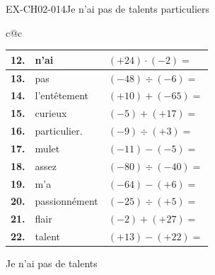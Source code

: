 \documentclass[12pt, a4paper]{article}
\begin{document}
\begin{exercice}{EX-CH02-014}{Je n'ai pas de talents particuliers}
\begin{center}
\begin{tabular}{c@{\hspace{8mm}}c}
  \begin{tabular}{|>{\centering\arraybackslash}p{6mm}|p{3.5cm}|p{3cm}|}
    \hline
    \cellcolor{gray!40}\textbf{12.} &n'ai& $(+24)\cdot(-2)=$             \\ \hline
    \cellcolor{gray!40}\textbf{13.} &pas& $(-48)\div(-6)=$               \\ \hline
    \cellcolor{gray!40}\textbf{14.} &l'entêtement& $(+10)+(-65)=$                \\ \hline
    \cellcolor{gray!40}\textbf{15.} &curieux& $(-5)+(+17)=$                 \\ \hline
    \cellcolor{gray!40}\textbf{16.} &particulier.& $(-9)\div(+3)=$                \\ \hline
    \cellcolor{gray!40}\textbf{17.} &mulet& $(-11)-(-5)=$       \\ \hline
    \cellcolor{gray!40}\textbf{18.} &assez& $(-80)\div(-40)=$              \\ \hline
    \cellcolor{gray!40}\textbf{19.} &m'a& $(-64)-(+6)=$      \\ \hline
    \cellcolor{gray!40}\textbf{20.} &passionnément& $(-25)\div(+5)=$               \\ \hline
    \cellcolor{gray!40}\textbf{21.} &flair& $(-2)+(+27)=$                 \\ \hline
    \cellcolor{gray!40}\textbf{22.} &talent& $(+13)-(+22)=$     \\ \hline
  \end{tabular}

\end{tabular}
\end{center}

\bigskip
\noindent Je n'ai pas de talents \dotfill \\
\vspace{1cm}
\noindent\dotfill\\[0.5cm]
\dotfill
{}

\end{exercice}
\end{document}

